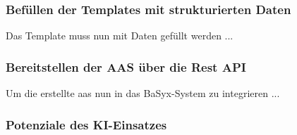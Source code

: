 \subsubsection{Befüllen der Templates mit strukturierten Daten}
Das Template muss nun mit Daten gefüllt werden ... 
\subsubsection{Bereitstellen der AAS über die Rest API}
Um die erstellte \acs{aas} nun in das BaSyx-System zu integrieren ... 
\subsubsection{Potenziale des KI-Einsatzes}